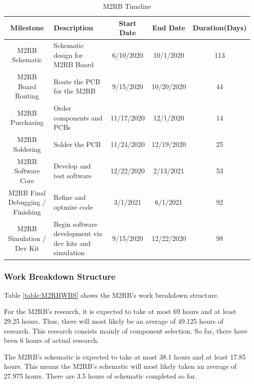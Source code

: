 \documentclass[crop=false]{standalone}
\begin{document}
        \begin{table}[ht]
        \begin{center}
        \begin{tabular}{|c|m{2.5cm}|c|c|c|}

        \hline
        Milestone & Description & Start Date & End Date & Duration(Days) \\ \hline
        M2RB Schematic & \raggedright Schematic design for M2RB Board & 6/10/2020 & 10/1/2020 & 113 \\ \hline
        M2RB Board Routing & Route the PCB for the M2RB & 9/15/2020 & 10/20/2020 & 44 \\ \hline
        M2RB Purchasing & \raggedright Order components and PCBs & 11/17/2020 & 12/1/2020 & 14  \\ \hline
        M2RB Soldering & Solder the PCB & 11/24/2020 & 12/19/2020 & 25 \\ \hline
        M2RB Software Core & \raggedright Develop and test software & 12/22/2020 & 2/13/2021 & 53 \\ \hline
        M2RB Final Debugging / Finishing & Refine and optmize code & 3/1/2021 & 6/1/2021 & 92 \\ \hline
        M2RB Simulation / Dev Kit & \raggedright Begin software development via dev kits and simulation & 9/15/2020 & 12/22/2020 & 98 \\ \hline
        \end{tabular}
        \caption{M2RB Timeline}
        \label{table:M2RBTimeline}
        \end{center}
        \end{table}
            
            
    \subsubsection{Work Breakdown Structure}
        
        Table \ref{table:M2RBWBS} shows the M2RB's work breakdown structure.
            
        For the M2RB's research, it is expected to take at most 69 hours and at least 29.25 hours. Thus, there will most likely be an average of 49.125 hours of research. This research consists mainly of component selection. So far, there have been 6 hours of actual research. 

        The M2RB's schematic is expected to take at most 38.1 hours and at least  17.85 hours. This means the M2RB's schematic will most likely taken an average of 27.975 hours. There are 3.5 hours of schematic completed so far. 
\end{document}
